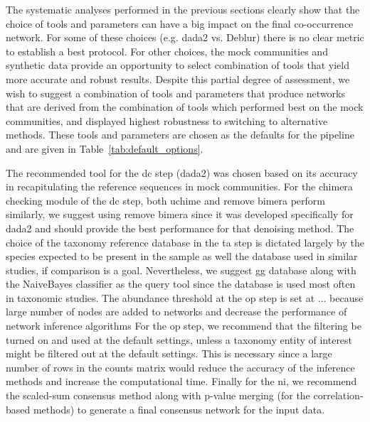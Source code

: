   The systematic analyses performed in the previous sections clearly show that the choice of tools and parameters can have a big impact on the final co-occurrence network.
  For some of these choices (e.g. \ac{dada2} vs. Deblur) there is no clear metric to establish a best protocol.
  For other choices, the mock communities and synthetic data provide an opportunity to select combination of tools that yield more accurate and robust results.
  Despite this partial degree of assessment, we wish to suggest a combination of tools and parameters that produce networks that are derived from the combination of tools which performed best on the mock communities, and displayed highest robustness to switching to alternative methods.
  These tools and parameters are chosen as the defaults for the pipeline and are given in Table~\ref{tab:default_options}.

  The recommended tool for the \ac{dc} step (\ac{dada2}) was chosen based on its accuracy in recapitulating the reference sequences in mock communities.
  For the chimera checking module of the \ac{dc} step, both uchime and remove bimera perform similarly, we suggest using remove bimera since it was developed specifically for \ac{dada2} and should provide the best performance for that denoising method.
  The choice of the taxonomy reference database in the \ac{ta} step is dictated largely by the species expected to be present in the sample as well the database used in similar studies, if comparison is a goal.
  Nevertheless, we suggest \ac{gg} database along with the NaiveBayes classifier as the query tool since the database is used most often in taxonomic studies.
  The abundance threshold at the \ac{op} step is set at ... because large number of nodes are added to networks and decrease the performance of network inference algorithms
  For the \ac{op} step, we recommend that the filtering be turned on and used at the default settings, unless a taxonomy entity of interest might be filtered out at the default settings.
  This is necessary since a large number of rows in the counts matrix would reduce the accuracy of the inference methods and increase the computational time.
  Finally for the \ac{ni}, we recommend the scaled-sum consensus method along with p-value merging (for the correlation-based methods) to generate a final consensus network for the input data.

